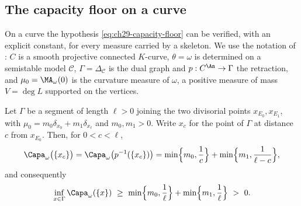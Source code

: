 \subsection{The capacity floor on a curve}
\label{sec:ch29-curve-floor}

On a curve the hypothesis \eqref{eq:ch29-capacity-floor} can be verified,
with an explicit constant, for every measure carried by a skeleton.  We use
the notation of : \(C\) is a smooth projective
connected \(K\)-curve, \(\theta=\omega\) is determined on a semistable model
\(\mathcal C\), \(\Gamma=\Delta_{\mathcal C}\) is the dual graph and
\(p:C^{\An}\to\Gamma\) the retraction, and
\(\mu_0=\MA_\omega(0)\) is the curvature measure of \(\omega\), a positive
measure of mass \(V=\deg L\) supported on the vertices.

\begin{proposition}
\label{prop:ch29-curve-point-capacity}
Let \(\Gamma\) be a segment of length \(\ell>0\) joining the two divisorial
points \(x_{E_0},x_{E_1}\), with
\(\mu_0=m_0\delta_{x_0}+m_1\delta_{x_\ell}\) and \(m_0,m_1>0\).  Write
\(x_c\) for the point of \(\Gamma\) at distance \(c\) from \(x_{E_0}\).
Then, for \(0<c<\ell\),
\begin{equation}
\label{eq:ch29-curve-point-capacity}
 \Capa_\omega\bigl(\{x_c\}\bigr)
 =\Capa_\omega\bigl(p^{-1}(\{x_c\})\bigr)
 =\min\Bigl\{m_0,\frac1c\Bigr\}+\min\Bigl\{m_1,\frac1{\ell-c}\Bigr\},
\end{equation}
and consequently
\begin{equation}
\label{eq:ch29-curve-floor}
 \inf_{x\in\Gamma}\Capa_\omega(\{x\})
 \ \geq\ \min\Bigl\{m_0,\frac1\ell\Bigr\}
      +\min\Bigl\{m_1,\frac1\ell\Bigr\}\ >\ 0 .
\end{equation}
\end{proposition}

